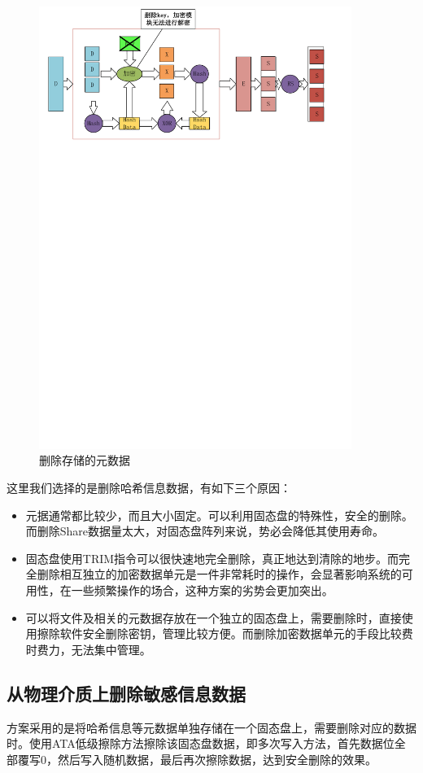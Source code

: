 \begin{figure}[H]
	\centering
	\includegraphics[width=4in]{Pics/del-hashkey.pdf}
	\caption{删除存储的元数据}\label{fig:7}
\end{figure}


这里我们选择的是删除哈希信息数据，有如下三个原因：
\begin{itemize}
	\item 元据通常都比较少，而且大小固定。可以利用固态盘的特殊性，安全的删除。而删除Share数据量太大，对固态盘阵列来说，势必会降低其使用寿命。
	\item 固态盘使用TRIM指令可以很快速地完全删除，真正地达到清除的地步。而完全删除相互独立的加密数据单元是一件非常耗时的操作，会显著影响系统的可用性，在一些频繁操作的场合，这种方案的劣势会更加突出。
	\item 可以将文件及相关的元数据存放在一个独立的固态盘上，需要删除时，直接使用擦除软件安全删除密钥，管理比较方便。而删除加密数据单元的手段比较费时费力，无法集中管理。
\end{itemize}

\subsection{从物理介质上删除敏感信息数据}
方案采用的是将哈希信息等元数据单独存储在一个固态盘上，需要删除对应的数据时。使用ATA低级擦除方法擦除该固态盘数据，即多次写入方法，首先数据位全部覆写0，然后写入随机数据，最后再次擦除数据，达到安全删除的效果\cite{Lee2008Secure,Swanson2010Safe}。
